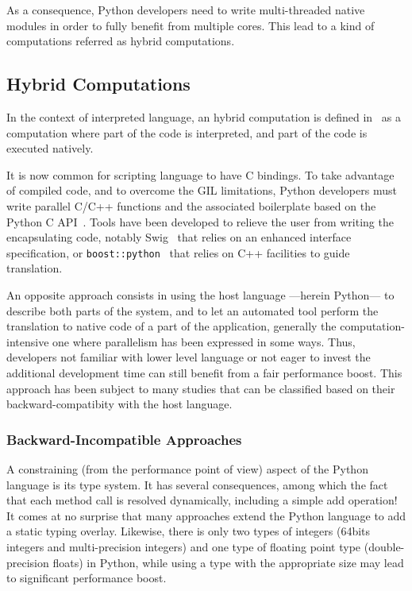 \documentclass{llncs}
\begin{document}
As a consequence, Python developers need to write multi-threaded native
modules in order to fully benefit from multiple cores. This lead to a kind of
computations referred as hybrid computations.



\subsection{Hybrid Computations}

In the context of interpreted language, an hybrid computation is defined
in~\cite{dongara2007} as a computation where part of the code is interpreted,
and part of the code is executed natively.

It is now common for scripting language to have C bindings. To take advantage of
compiled code, and to overcome the GIL limitations, Python developers must write
parallel C/C++ functions and the associated boilerplate based on the Python C
API~\cite{pythoncapi}. Tools have been developed to relieve the user from
writing the encapsulating code, notably Swig~\cite{swig2003} that relies on an
enhanced interface specification, or
\texttt{boost::python}~\cite{boostpython2007} that relies on C++ facilities to
guide translation.

An opposite approach consists in using the host language ---herein Python---
to describe both parts of the system, and to let an automated tool perform the
translation to native code of a part of the application, generally the
computation-intensive one where parallelism has been expressed in some ways.
Thus, developers not familiar with lower level language or not eager to invest
the additional development time can still benefit from a fair performance boost.
This approach has been subject to many studies that can be classified based on
their backward-compatibity with the host language.

\subsubsection{Backward-Incompatible Approaches}

A constraining (from the performance point of view) aspect of the Python
language is its type system. It has several consequences, among which the fact
that each method call is resolved dynamically, including a simple add
operation! It comes at no surprise that many approaches extend the Python
language to add a static typing overlay. Likewise, there is only two types of
integers (64bits integers and multi-precision integers) and one type of floating
point type (double-precision floats) in Python, while using a type with the
appropriate size may lead to significant performance boost.
\end{document}
